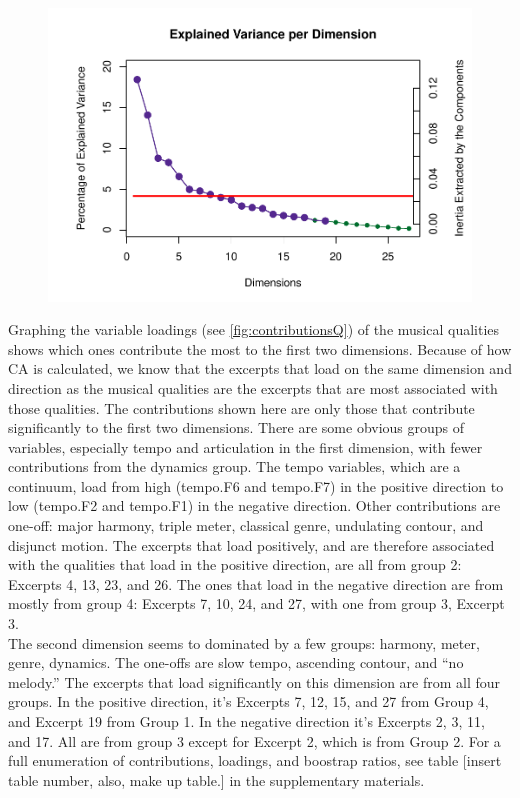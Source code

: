\documentclass[
  english,
  man,floatsintext]{apa6}
\begin{document}
\begin{figure}

{\centering \includegraphics{Music-Descriptor-Space_files/figure-latex/scree4excerptsq-1} 

}

\caption{ }\label{fig:scree4excerptsq}
\end{figure}

Graphing the variable loadings (see \ref{fig:contributionsQ}) of the musical qualities shows which ones contribute the most to the first two dimensions. Because of how CA is calculated, we know that the excerpts that load on the same dimension and direction as the musical qualities are the excerpts that are most associated with those qualities. The contributions shown here are only those that contribute significantly to the first two dimensions.
There are some obvious groups of variables, especially tempo and articulation in the first dimension, with fewer contributions from the dynamics group. The tempo variables, which are a continuum, load from high (tempo.F6 and tempo.F7) in the positive direction to low (tempo.F2 and tempo.F1) in the negative direction. Other contributions are one-off: major harmony, triple meter, classical genre, undulating contour, and disjunct motion. The excerpts that load positively, and are therefore associated with the qualities that load in the positive direction, are all from group 2: Excerpts 4, 13, 23, and 26. The ones that load in the negative direction are from mostly from group 4: Excerpts 7, 10, 24, and 27, with one from group 3, Excerpt 3.\\
The second dimension seems to dominated by a few groups: harmony, meter, genre, dynamics. The one-offs are slow tempo, ascending contour, and ``no melody.'' The excerpts that load significantly on this dimension are from all four groups. In the positive direction, it's Excerpts 7, 12, 15, and 27 from Group 4, and Excerpt 19 from Group 1. In the negative direction it's Excerpts 2, 3, 11, and 17. All are from group 3 except for Excerpt 2, which is from Group 2. For a full enumeration of contributions, loadings, and boostrap ratios, see table {[}insert table number, also, make up table.{]} in the supplementary materials.
\end{document}
